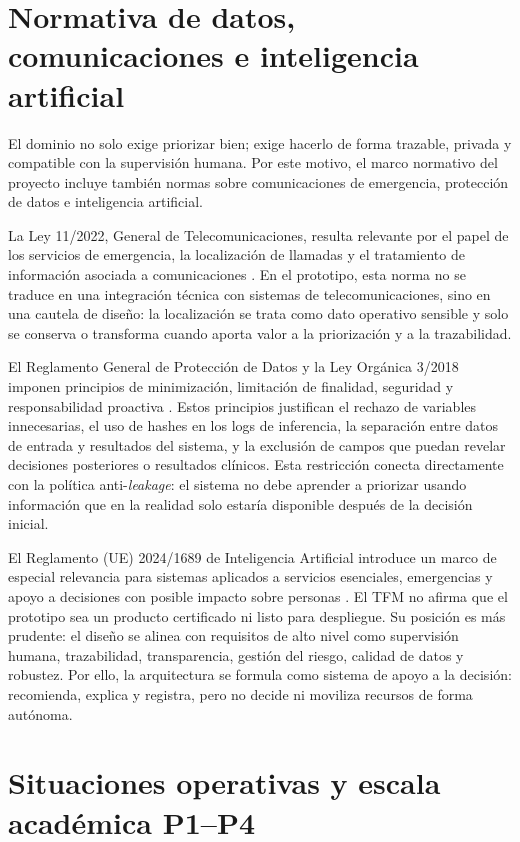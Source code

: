 \section{Normativa de datos, comunicaciones e inteligencia artificial}

El dominio no solo exige priorizar bien; exige hacerlo de forma trazable, privada y compatible con la supervisión humana. Por este motivo, el marco normativo del proyecto incluye también normas sobre comunicaciones de emergencia, protección de datos e inteligencia artificial.

La Ley 11/2022, General de Telecomunicaciones, resulta relevante por el papel de los servicios de emergencia, la localización de llamadas y el tratamiento de información asociada a comunicaciones \cite{Ley11_2022}. En el prototipo, esta norma no se traduce en una integración técnica con sistemas de telecomunicaciones, sino en una cautela de diseño: la localización se trata como dato operativo sensible y solo se conserva o transforma cuando aporta valor a la priorización y a la trazabilidad.

El Reglamento General de Protección de Datos y la Ley Orgánica 3/2018 imponen principios de minimización, limitación de finalidad, seguridad y responsabilidad proactiva \cite{RGPD,LOPDGDD}. Estos principios justifican el rechazo de variables innecesarias, el uso de hashes en los logs de inferencia, la separación entre datos de entrada y resultados del sistema, y la exclusión de campos que puedan revelar decisiones posteriores o resultados clínicos. Esta restricción conecta directamente con la política anti-\textit{leakage}: el sistema no debe aprender a priorizar usando información que en la realidad solo estaría disponible después de la decisión inicial.

El Reglamento (UE) 2024/1689 de Inteligencia Artificial introduce un marco de especial relevancia para sistemas aplicados a servicios esenciales, emergencias y apoyo a decisiones con posible impacto sobre personas \cite{EUAIAct2024}. El TFM no afirma que el prototipo sea un producto certificado ni listo para despliegue. Su posición es más prudente: el diseño se alinea con requisitos de alto nivel como supervisión humana, trazabilidad, transparencia, gestión del riesgo, calidad de datos y robustez. Por ello, la arquitectura se formula como sistema de apoyo a la decisión: recomienda, explica y registra, pero no decide ni moviliza recursos de forma autónoma.

\section{Situaciones operativas y escala académica P1--P4}

